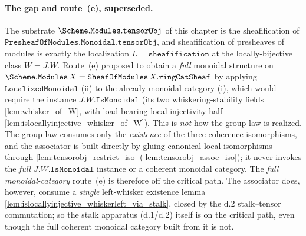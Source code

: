 \paragraph{The gap and route~(e), superseded.} The substrate
\(\Scheme.\mathtt{Modules}.\mathtt{tensorObj}\) of this chapter is the
sheafification of \(\mathtt{PresheafOfModules.Monoidal.tensorObj}\), and
sheafification of presheaves of modules is exactly the localization
\(L = \mathtt{sheafification}\) at the locally-bijective class \(W = J.W\). Route~(e)
proposed to obtain a \emph{full} monoidal structure on
\(\Scheme.\mathtt{Modules}\,X = \mathtt{SheafOfModules}\,X.\mathtt{ringCatSheaf}\)
by applying \(\mathtt{LocalizedMonoidal}\) (ii) to the already-monoidal category (i),
which would require the instance \(J.W.\mathtt{IsMonoidal}\) (its two
whiskering-stability fields \cref{lem:whisker_of_W}, with load-bearing
local-injectivity half \cref{lem:islocallyinjective_whisker_of_W}). This is
\emph{not} how the group law is realized. The group law consumes only the
\emph{existence} of the three coherence isomorphisms, and the associator is built
directly by gluing canonical local isomorphisms through
\cref{lem:tensorobj_restrict_iso} (\cref{lem:tensorobj_assoc_iso}); it never invokes
the \emph{full} \(J.W.\mathtt{IsMonoidal}\) instance or a coherent monoidal category.
The \emph{full monoidal-category} route~(e) is therefore off the critical path. The
associator does, however, consume a \emph{single} left-whisker existence lemma
\cref{lem:islocallyinjective_whiskerleft_via_stalk}, closed by the d.2 stalk--tensor
commutation; so the stalk apparatus (d.1/d.2) itself is on the critical path, even
though the full coherent monoidal category built from it is not.

